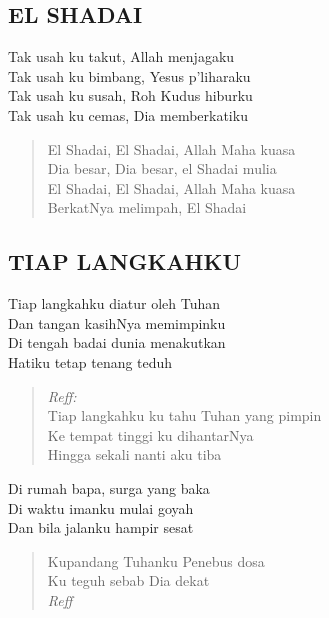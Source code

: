 \subsection{ EL SHADAI}
\begin{altverse}
Tak usah ku takut, Allah menjagaku\\
Tak usah ku bimbang, Yesus p’liharaku\\
Tak usah ku susah, Roh Kudus hiburku\\
Tak usah ku cemas, Dia memberkatiku
\end{altverse}

\begin{verse}
El Shadai, El Shadai, Allah Maha kuasa\\
Dia besar, Dia besar, el Shadai mulia\\
El Shadai, El Shadai, Allah Maha kuasa\\
BerkatNya melimpah, El Shadai
\end{verse}

\subsection{ TIAP LANGKAHKU}
\begin{altverse}
Tiap langkahku diatur oleh Tuhan\\
Dan tangan kasihNya memimpinku\\
Di tengah badai dunia menakutkan\\
Hatiku tetap tenang teduh
\end{altverse}

\begin{verse}
\textit{Reff:}\\
Tiap langkahku ku tahu Tuhan yang pimpin\\
Ke tempat tinggi ku dihantarNya\\
Hingga sekali nanti aku tiba
\end{verse}

\begin{altverse}
Di rumah bapa, surga yang baka\\
Di waktu imanku mulai goyah\\
Dan bila jalanku hampir sesat
\end{altverse}

\begin{verse}
Kupandang Tuhanku Penebus dosa\\
Ku teguh sebab Dia dekat\\
\textit{Reff}
\end{verse}


